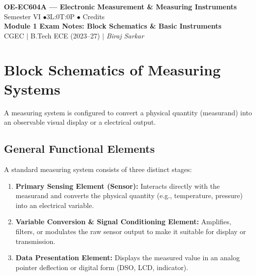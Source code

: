 \documentclass[12pt,a4paper]{article}
\begin{document}

\begin{center}
  {\LARGE\bfseries\color{myred} OE-EC604A --- Electronic Measurement \& Measuring Instruments}\\[5pt]
  {\normalsize\color{mydark} Semester VI \quad$\bullet$\quad 3L:0T:0P \quad$\bullet$ Credits}\\[3pt]
  {\normalsize\color{myteal}\textbf{Module 1 Exam Notes: Block Schematics \& Basic Instruments}}\\[3pt]
  {\small\color{mydark} CGEC \;$|$\; B.Tech ECE (2023--27) \;$|$\; \textit{Biraj Sarkar}}
\end{center}
\vspace{2pt}
\noindent{\color{myred}\rule{\linewidth}{1.5pt}}
\vspace{2pt}

\hypersetup{linkcolor=mydark}
\tableofcontents
\hypersetup{linkcolor=myteal}
\newpage

\section{Block Schematics of Measuring Systems}

A measuring system is configured to convert a physical quantity (measurand) into an observable visual display or a electrical output. 

\subsection{General Functional Elements}
A standard measuring system consists of three distinct stages:
\begin{enumerate}[label=\arabic*., leftmargin=*]
  \item \textbf{Primary Sensing Element (Sensor):} Interacts directly with the measurand and converts the physical quantity (e.g., temperature, pressure) into an electrical variable.
  \item \textbf{Variable Conversion \& Signal Conditioning Element:} Amplifies, filters, or modulates the raw sensor output to make it suitable for display or transmission.
  \item \textbf{Data Presentation Element:} Displays the measured value in an analog pointer deflection or digital form (DSO, LCD, indicator).
\end{enumerate}
\end{document}
